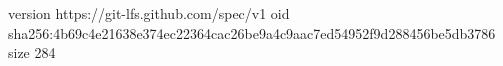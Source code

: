 version https://git-lfs.github.com/spec/v1
oid sha256:4b69c4e21638e374ec22364cac26be9a4c9aac7ed54952f9d288456be5db3786
size 284
